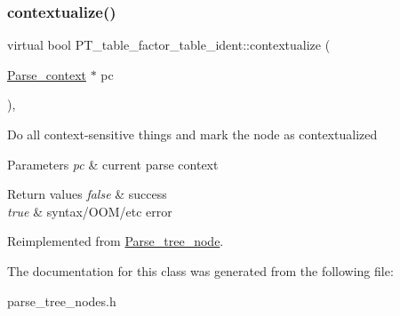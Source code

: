 \subsubsection{\texorpdfstring{contextualize()}{contextualize()}}
{\footnotesize\ttfamily virtual bool P\+T\+\_\+table\+\_\+factor\+\_\+table\+\_\+ident\+::contextualize (\begin{DoxyParamCaption}\item[{\mbox{\hyperlink{structParse__context}{Parse\+\_\+context}} $\ast$}]{pc }\end{DoxyParamCaption})\hspace{0.3cm}{\ttfamily [inline]}, {\ttfamily [virtual]}}

Do all context-\/sensitive things and mark the node as contextualized


\begin{DoxyParams}{Parameters}
{\em pc} & current parse context\\
\hline
\end{DoxyParams}

\begin{DoxyRetVals}{Return values}
{\em false} & success \\
\hline
{\em true} & syntax/\+O\+O\+M/etc error \\
\hline
\end{DoxyRetVals}


Reimplemented from \mbox{\hyperlink{classParse__tree__node_a22d93524a537d0df652d7efa144f23da}{Parse\+\_\+tree\+\_\+node}}.



The documentation for this class was generated from the following file\+:\begin{DoxyCompactItemize}
\item 
parse\+\_\+tree\+\_\+nodes.\+h\end{DoxyCompactItemize}
